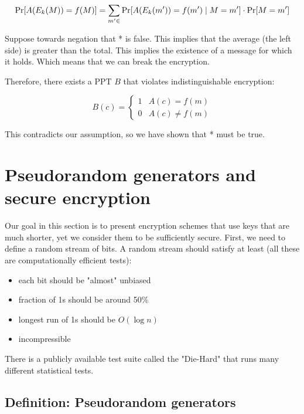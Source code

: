 \documentclass{idc_msc}
\let\Messagespace\relax
\newcommand{\Messagespace}{\texorpdfstring{\ensuremath{\mathcal{P}}}{P}}
\begin{document}
\[
  \Pr[A(E_k(M)) = f(M)] = \sum_{m' \in \Messagespace} \Pr[A(E_k(m')) = f(m') \mid M = m'] \cdot \Pr[M = m']
\]

Suppose towards negation that * is false.
This implies that the average (the left side) is greater than the total.
This implies the existence of a message for which it holds.
Which means that we can break the encryption.




Therefore, there exists a PPT \(B\) that violates indistinguishable encryption:

\[
B(c) = \begin{cases}
1 & A(c) = f(m) \\
0 & A(c) \ne f(m)
\end{cases}
\]

This contradicts our assumption, so we have shown that * must be true.

\section{Pseudorandom generators and secure encryption}

Our goal in this section is to present encryption schemes that use keys that are much shorter, yet we consider them to be sufficiently secure.
First, we need to define a random stream of bits.
A random stream should satisfy at least (all these are computationally efficient tests):

\begin{itemize}
  \item each bit should be "almost" unbiased
  \item fraction of 1s should be around 50\%
  \item longest run of 1s should be \(O(\log n)\)
  \item incompressible
\end{itemize}

There is a publicly available test suite called the "Die-Hard" that runs many different statistical tests.

\subsection{Definition: Pseudorandom generators}
\end{document}
